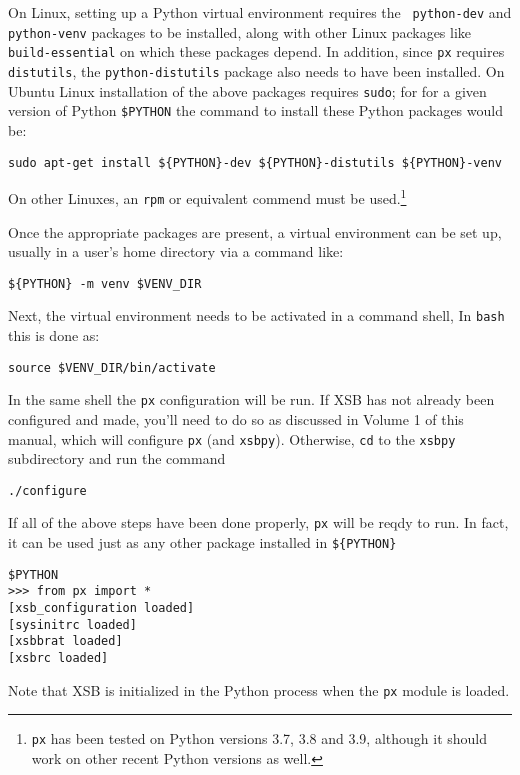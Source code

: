 On Linux, setting up a Python virtual environment requires the {\tt
  python-dev} and {\tt python-venv} packages to be installed, along
with other Linux packages like {\tt build-essential} on which these
packages depend.  In addition, since {\tt px} requires {\tt
  distutils}, the {\tt python-distutils} package also needs to have
been installed.  On Ubuntu Linux installation of the above packages
requires {\tt sudo}; for for a given version of Python {\tt \$PYTHON}
the command to install these Python packages would be:

{\tt sudo apt-get install \$\{PYTHON\}-dev \$\{PYTHON\}-distutils
\$\{PYTHON\}-venv}

\noindent
On other Linuxes, an {\tt rpm} or equivalent commend must be
used.\footnote{{\tt px} has been tested on Python versions 3.7, 3.8
  and 3.9, although it should work on other recent Python versions as
  well.}

Once the appropriate packages are present, a virtual environment can
be set up, usually in a user's home directory via a command like:

{\tt \$\{PYTHON\} -m venv {\tt \$VENV\_DIR}}

Next, the virtual environment needs to be activated in a command
shell,  In {\tt bash} this is done as:

{\tt source \$VENV\_DIR/bin/activate  }

In the same shell the {\tt px} configuration will be run.  If XSB has
not already been configured and made, you'll need to do so as
discussed in Volume 1 of this manual, which will configure {\tt px}
(and {\tt xsbpy}).  Otherwise, {\tt cd} to the {\tt xsbpy}
subdirectory and run the command

{\tt ./configure}

If all of the above steps have been done properly, {\tt px} will be
reqdy to run.  In fact, it can be used just as any other package
installed in {\tt \$\{PYTHON\}}

\begin{verbatim}
$PYTHON
>>> from px import *
[xsb_configuration loaded]
[sysinitrc loaded]
[xsbbrat loaded]
[xsbrc loaded]
\end{verbatim}

\noindent
Note that XSB is initialized in the Python process when the {\tt px}
module is loaded.



